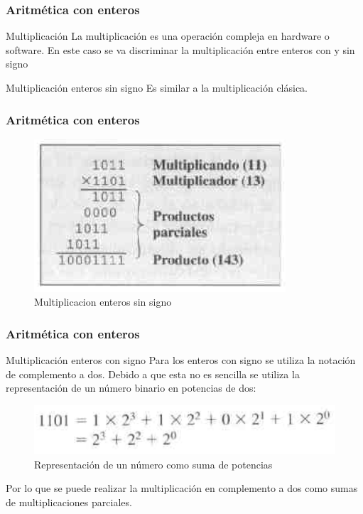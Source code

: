 \documentclass{beamer}
\begin{document}
\begin{frame}
	\frametitle{Aritmética con enteros}
	\begin{block}{Multiplicación}
		La multiplicación es una operación compleja en hardware o software. En este caso se va discriminar la multiplicación entre enteros con y sin signo
	\end{block}	
	\begin{block}{Multiplicación enteros sin signo}
		Es similar a la multiplicación clásica.
	\end{block}	
\end{frame}

\begin{frame}
	\frametitle{Aritmética con enteros}
	\begin{figure}[H]
		\centering
		\includegraphics[scale=0.7]{imagenes/multiplicacion.png}
		\caption{Multiplicacion enteros sin signo}
	\end{figure}
\end{frame}

\begin{frame}
	\frametitle{Aritmética con enteros}
	\begin{block}{Multiplicación enteros con signo}
		Para los enteros con signo se utiliza la notación de complemento a dos. Debido a que esta no es sencilla se utiliza la representación de un número binario en potencias de dos:
	\begin{figure}[H]
		\centering
		\includegraphics[scale=0.4]{imagenes/representaciondecimal.png}
		\caption{Representación de un número como suma de potencias}
	\end{figure}
	Por lo que se puede realizar la multiplicación en complemento a dos como sumas de multiplicaciones parciales.
	\end{block}	
\end{frame}
\end{document}
